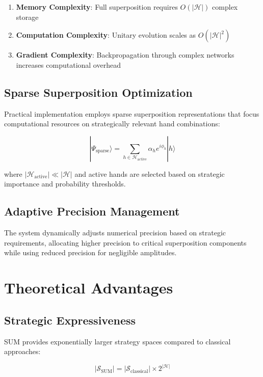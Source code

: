 \documentclass[11pt,a4paper]{article}
\begin{document}
\begin{enumerate}
\item \textbf{Memory Complexity}: Full superposition requires $O(|\mathcal{H}|)$ complex storage
\item \textbf{Computation Complexity}: Unitary evolution scales as $O(|\mathcal{H}|^2)$
\item \textbf{Gradient Complexity}: Backpropagation through complex networks increases computational overhead
\end{enumerate}

\subsection{Sparse Superposition Optimization}

Practical implementation employs sparse superposition representations that focus computational resources on strategically relevant hand combinations:

\begin{equation}
|\Psi_{\text{sparse}}\rangle = \sum_{h \in \mathcal{H}_{\text{active}}} \alpha_h e^{i\phi_h} |h\rangle
\end{equation}

where $|\mathcal{H}_{\text{active}}| \ll |\mathcal{H}|$ and active hands are selected based on strategic importance and probability thresholds.

\subsection{Adaptive Precision Management}

The system dynamically adjusts numerical precision based on strategic requirements, allocating higher precision to critical superposition components while using reduced precision for negligible amplitudes.

\section{Theoretical Advantages}

\subsection{Strategic Expressiveness}

SUM provides exponentially larger strategy spaces compared to classical approaches:

\begin{equation}
|\mathcal{S}_{\text{SUM}}| = |\mathcal{S}_{\text{classical}}| \times 2^{|\mathcal{H}|}
\end{equation}
\end{document}
